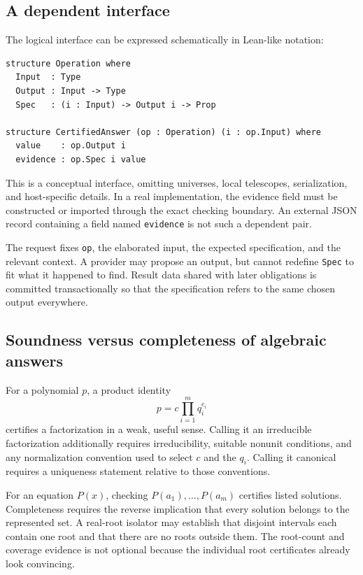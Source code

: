 \documentclass[11pt,a4paper]{article}
\newcommand{\code}[1]{\nolinkurl{#1}}
\theoremstyle{definition}
\begin{document}
\subsection{A dependent interface}
The logical interface can be expressed schematically in Lean-like notation:
\par\noindent\begin{minipage}{\linewidth}
\begin{lstlisting}
structure Operation where
  Input  : Type
  Output : Input -> Type
  Spec   : (i : Input) -> Output i -> Prop

structure CertifiedAnswer (op : Operation) (i : op.Input) where
  value    : op.Output i
  evidence : op.Spec i value
\end{lstlisting}
\end{minipage}\par
This is a conceptual interface, omitting universes, local telescopes, serialization,
and host-specific details. In a real implementation, the evidence field must be
constructed or imported through the exact checking boundary. An external JSON
record containing a field named \code{evidence} is not such a dependent pair.

The request fixes \code{op}, the elaborated input, the expected specification,
and the relevant context. A provider may propose an output, but cannot redefine
\code{Spec} to fit what it happened to find. Result data shared with later
obligations is committed transactionally so that the specification refers to the
same chosen output everywhere.

\subsection{Soundness versus completeness of algebraic answers}
For a polynomial $p$, a product identity
\[
 p=c\prod_{i=1}^{m}q_i^{e_i}
\]
certifies a factorization in a weak, useful sense. Calling it an irreducible
factorization additionally requires irreducibility, suitable nonunit conditions,
and any normalization convention used to select $c$ and the $q_i$. Calling it
canonical requires a uniqueness statement relative to those conventions.

For an equation $P(x)$, checking $P(a_1),\ldots,P(a_m)$ certifies listed
solutions. Completeness requires the reverse implication that every solution
belongs to the represented set. A real-root isolator may establish that disjoint
intervals each contain one root and that there are no roots outside them. The
root-count and coverage evidence is not optional because the individual root
certificates already look convincing.
\end{document}
